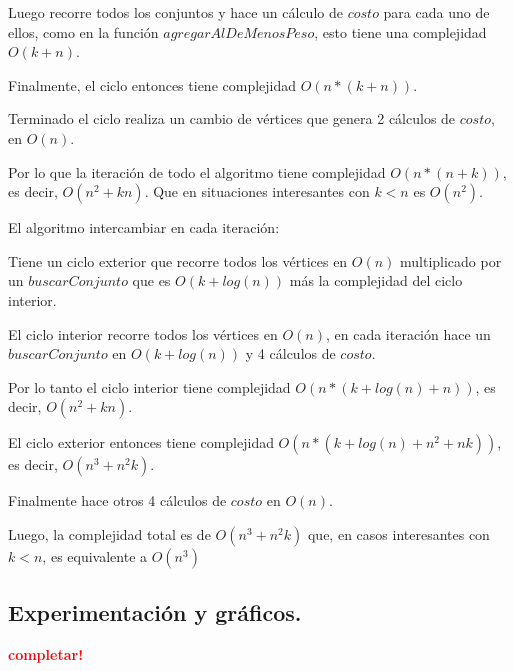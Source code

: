 Luego recorre todos los conjuntos y hace un cálculo de $costo$ para cada uno de
ellos, como en la función $agregarAlDeMenosPeso$, esto tiene una complejidad
$O(k + n)$.

Finalmente, el ciclo entonces tiene complejidad $O(n * (k + n))$.

Terminado el ciclo realiza un cambio de vértices que genera 2 cálculos de
$costo$, en $O(n)$.

Por lo que la iteración de todo el algoritmo tiene complejidad $O(n * (n + k))$,
es decir, $O(n^2 + kn)$. Que en situaciones interesantes con $k < n$ es $O(n^2)$.

\vspace*{0.3cm}

El algoritmo intercambiar en cada iteración:

Tiene un ciclo exterior que recorre todos los vértices en $O(n)$ multiplicado
por un $buscarConjunto$ que es $O(k + log(n))$ más la complejidad del ciclo
interior.

El ciclo interior recorre todos los vértices en $O(n)$, en cada iteración hace
un $buscarConjunto$ en $O(k + log(n))$ y 4 cálculos de $costo$.

Por lo tanto el ciclo interior tiene complejidad $O(n * (k + log(n) + n))$,
es decir, $O(n^2 + kn)$.

El ciclo exterior entonces tiene complejidad $O(n * (k + log(n) + n^2 + nk))$,
es decir, $O(n^3 + n^2k)$.

Finalmente hace otros 4 cálculos de $costo$ en $O(n)$.

Luego, la complejidad total es de $O(n^3 + n^2k)$ que, en casos interesantes
con $k < n$, es equivalente a $O(n^3)$

\newpage \subsection{Experimentación y gráficos.}
\vspace*{0.3cm}

\textcolor{red}{\textbf{completar!}}
